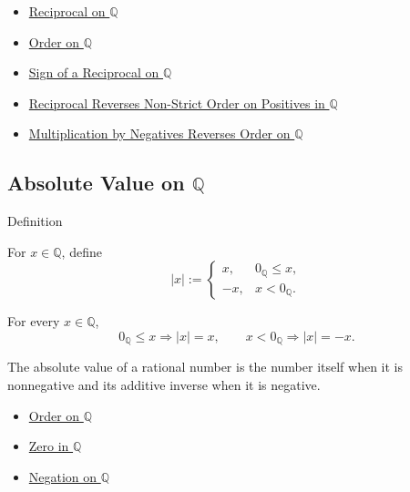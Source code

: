 \begin{dependencies}
\begin{itemize}
  \item \hyperref[def:reciprocal-on-q-classes]{Reciprocal on $\mathbb{Q}$}
  \item \hyperref[def:order-on-q]{Order on $\mathbb{Q}$}
  \item \hyperref[thm:sign-of-reciprocal-q]{Sign of a Reciprocal on $\mathbb{Q}$}
  \item \hyperref[thm:reciprocal-reverses-nonstrict-order-on-positives-q]{Reciprocal Reverses Non-Strict Order on Positives in $\mathbb{Q}$}
  \item \hyperref[cor:negative-multiplication-reverses-order-on-q]{Multiplication by Negatives Reverses Order on $\mathbb{Q}$}
\end{itemize}
\end{dependencies}

\subsection*{\texorpdfstring{Absolute Value on $\mathbb{Q}$}{Absolute Value on Q}}

\begin{definitionbox}{Definition}
\begin{definition}
\label{def:absolute-value-on-q}
For $x\in\mathbb{Q}$, define
\[
|x|:=
\begin{cases}
x, & 0_{\mathbb{Q}}\le x,\\
-x, & x<0_{\mathbb{Q}}.
\end{cases}
\]
\end{definition}
\end{definitionbox}

\begin{remark*}
For every $x\in\mathbb{Q}$,
\[
0_{\mathbb{Q}}\le x\Longrightarrow |x|=x,
\qquad
x<0_{\mathbb{Q}}\Longrightarrow |x|=-x.
\]
\end{remark*}

\begin{remark*}[Interpretation]
The absolute value of a rational number is the number itself when it is
nonnegative and its additive inverse when it is negative.
\end{remark*}

\begin{dependencies}
\begin{itemize}
  \item \hyperref[def:order-on-q]{Order on $\mathbb{Q}$}
  \item \hyperref[def:zero-in-q]{Zero in $\mathbb{Q}$}
  \item \hyperref[def:negation-on-q-classes]{Negation on $\mathbb{Q}$}
\end{itemize}
\end{dependencies}

